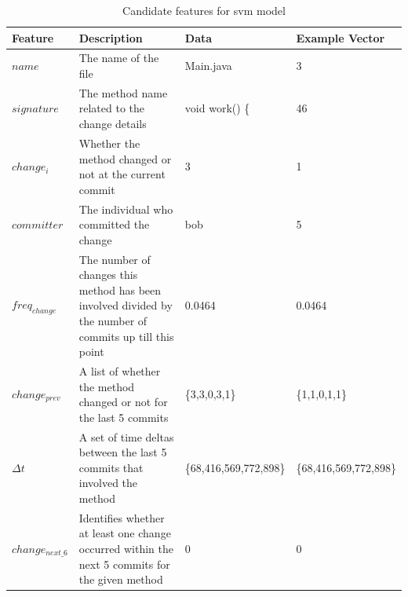 \begin{table}
\begin{center}
    \begin{tabularx}{\linewidth}{|l|X|l|l|}
        \hline
        Feature & Description & Data & Example Vector \\
        \hline
        $name$ & The name of the file & Main.java & 3 \\ \hline
        $signature$ & The method name related to the change details & void work() \{ & 46\\ \hline
        $change_i$ & Whether the method changed or not at the current commit & 3 & 1 \\ \hline
        $committer$ & The individual who committed the change & bob & 5 \\ \hline
        $freq_{change}$ & The number of changes this method has been involved divided by the number of commits up till this point & 0.0464 & 0.0464 \\ \hline
        $change_{prev}$ & A list of whether the method changed or not for the last 5 commits & \{3,3,0,3,1\} & \{1,1,0,1,1\} \\ \hline
        $\Delta t$ & A set of time deltas between the last 5 commits that involved the method & \{68,416,569,772,898\} & \{68,416,569,772,898\} \\
        \hline
        $change_{next\_6}$ & Identifies whether at least one change occurred within the next 5 commits for the given method & 0 & 0\\
        \hline
    \end{tabularx}
\end{center}
    \caption{Candidate features for \gls{svm} model}
    \label{tab:candidate_features}
\end{table}


